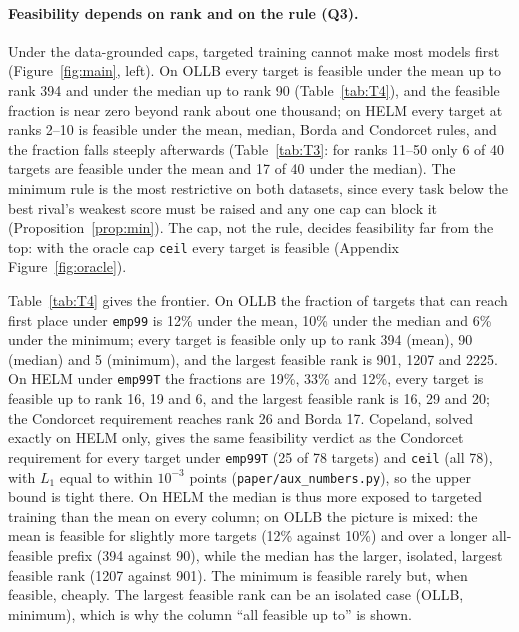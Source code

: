 \documentclass{article}
\begin{document}
\paragraph{Feasibility depends on rank and on the rule (Q3).}
Under the data-grounded caps, targeted training cannot make most models first (Figure~\ref{fig:main}, left). On OLLB every target is feasible under the mean up to rank 394 and under the median up to rank 90 (Table~\ref{tab:T4}), and the feasible fraction is near zero beyond rank about one thousand; on HELM every target at ranks 2--10 is feasible under the mean, median, Borda and Condorcet rules, and the fraction falls steeply afterwards (Table~\ref{tab:T3}: for ranks 11--50 only 6 of 40 targets are feasible under the mean and 17 of 40 under the median). The minimum rule is the most restrictive on both datasets, since every task below the best rival's weakest score must be raised and any one cap can block it (Proposition~\ref{prop:min}). The cap, not the rule, decides feasibility far from the top: with the oracle cap \texttt{ceil} every target is feasible (Appendix Figure~\ref{fig:oracle}).

Table~\ref{tab:T4} gives the frontier. On OLLB the fraction of targets that can reach first place under \texttt{emp99} is 12\% under the mean, 10\% under the median and 6\% under the minimum; every target is feasible only up to rank 394 (mean), 90 (median) and 5 (minimum), and the largest feasible rank is 901, 1207 and 2225. On HELM under \texttt{emp99T} the fractions are 19\%, 33\% and 12\%, every target is feasible up to rank 16, 19 and 6, and the largest feasible rank is 16, 29 and 20; the Condorcet requirement reaches rank 26 and Borda 17. Copeland, solved exactly on HELM only, gives the same feasibility verdict as the Condorcet requirement for every target under \texttt{emp99T} (25 of 78 targets) and \texttt{ceil} (all 78), with $L_1$ equal to within $10^{-3}$ points (\texttt{paper/aux\_numbers.py}), so the upper bound is tight there. On HELM the median is thus more exposed to targeted training than the mean on every column; on OLLB the picture is mixed: the mean is feasible for slightly more targets (12\% against 10\%) and over a longer all-feasible prefix (394 against 90), while the median has the larger, isolated, largest feasible rank (1207 against 901). The minimum is feasible rarely but, when feasible, cheaply. The largest feasible rank can be an isolated case (OLLB, minimum), which is why the column ``all feasible up to'' is shown.
\end{document}
